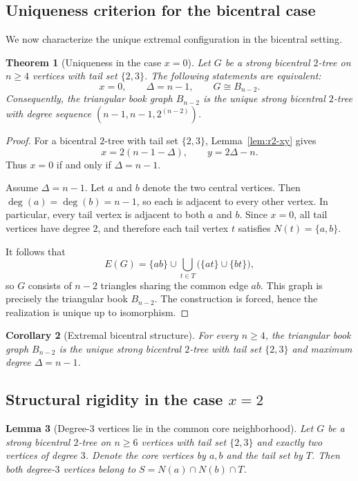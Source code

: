\documentclass[12pt]{article}
\newtheorem{theorem}{Theorem}[section]
\newtheorem{lemma}[theorem]{Lemma}
\newtheorem{corollary}[theorem]{Corollary}
\numberwithin{equation}{section}
\begin{document}
\subsection{Uniqueness criterion for the bicentral case}

We now characterize the unique extremal configuration in the bicentral setting.

\begin{theorem}[Uniqueness in the case $x=0$]
\label{thm:r2-unique}
Let $G$ be a strong bicentral $2$-tree on $n\ge 4$ vertices with tail set
$\{2,3\}$.
The following statements are equivalent:
\[
x=0, \qquad \Delta=n-1, \qquad G \cong B_{n-2}.
\]
Consequently, the triangular book graph $B_{n-2}$ is the unique strong bicentral
$2$-tree with degree sequence $(n-1,n-1,2^{(n-2)})$.
\end{theorem}

\begin{proof}
For a bicentral $2$-tree with tail set $\{2,3\}$, Lemma~\ref{lem:r2-xy} gives
\[
x = 2(n-1-\Delta), \qquad y = 2\Delta - n.
\]
Thus $x=0$ if and only if $\Delta=n-1$.

Assume $\Delta=n-1$.
Let $a$ and $b$ denote the two central vertices.
Then $\deg(a)=\deg(b)=n-1$, so each is adjacent to every other vertex.
In particular, every tail vertex is adjacent to both $a$ and $b$.
Since $x=0$, all tail vertices have degree $2$, and therefore each tail vertex
$t$ satisfies $N(t)=\{a,b\}$.

It follows that
\[
E(G)=\{ab\}\cup \bigcup_{t\in T}\bigl(\{at\}\cup\{bt\}\bigr),
\]
so $G$ consists of $n-2$ triangles sharing the common edge $ab$.
This graph is precisely the triangular book $B_{n-2}$.
The construction is forced, hence the realization is unique up to isomorphism.
\end{proof}

\begin{corollary}[Extremal bicentral structure]
\label{cor:r2-extremal}
For every $n\ge 4$, the triangular book graph $B_{n-2}$ is the unique strong
bicentral $2$-tree with tail set $\{2,3\}$ and maximum degree $\Delta=n-1$.
\end{corollary}

\subsection{Structural rigidity in the case $x=2$}

\begin{lemma}[Degree-$3$ vertices lie in the common core neighborhood]
\label{lem:deg3-in-S}
Let $G$ be a strong bicentral $2$-tree on $n\ge 6$ vertices with tail set 
$\{2,3\}$ and exactly two vertices of degree $3$. Denote the core vertices 
by $a,b$ and the tail set by $T$. Then both degree-$3$ vertices belong to 
$S=N(a)\cap N(b)\cap T$.
\end{lemma}
\end{document}
